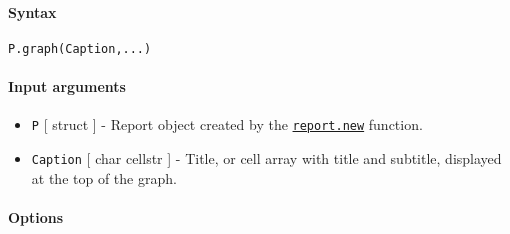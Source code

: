 


	\paragraph{Syntax}

\begin{verbatim}
P.graph(Caption,...)
\end{verbatim}

\paragraph{Input arguments}

\begin{itemize}
\item
  \texttt{P} {[} struct {]} - Report object created by the
  \href{report/new}{\texttt{report.new}} function.
\item
  \texttt{Caption} {[} char \textbar{} cellstr {]} - Title, or cell
  array with title and subtitle, displayed at the top of the graph.
\end{itemize}

\paragraph{Options}

